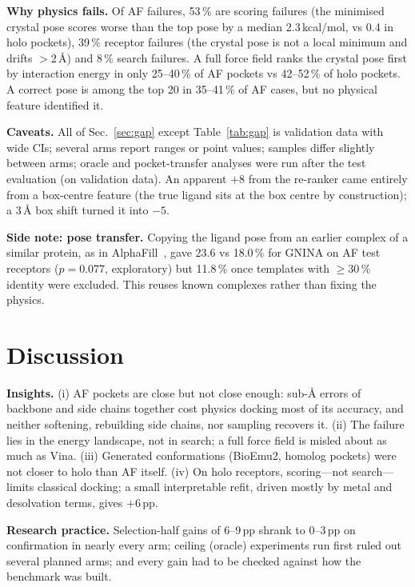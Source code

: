 \documentclass[10pt,a4paper,twocolumn]{article}
\newcommand{\pp}{\,pp}
\begin{document}
\textbf{Why physics fails.} Of AF failures, 53\,\% are scoring failures (the minimised crystal pose scores worse than
the top pose by a median 2.3\,kcal/mol, vs 0.4 in holo pockets), 39\,\% receptor failures (the crystal pose is not a
local minimum and drifts $>2$\,\AA) and 8\,\% search failures. A full force field ranks the crystal pose first by
interaction energy in only 25--40\,\% of AF pockets vs 42--52\,\% of holo pockets. A correct pose is among the top 20
in 35--41\,\% of AF cases, but no physical feature identified it.

\textbf{Caveats.} All of Sec.~\ref{sec:gap} except Table~\ref{tab:gap} is validation data with wide CIs; several arms
report ranges or point values; samples differ slightly between arms; oracle and pocket-transfer analyses were run
after the test evaluation (on validation data). An apparent $+8$ from the re-ranker came entirely from a box-centre
feature (the true ligand sits at the box centre by construction); a 3\,\AA{} box shift turned it into $-5$.

\textbf{Side note: pose transfer.} Copying the ligand pose from an earlier complex of a similar protein, as in
AlphaFill~\cite{hekkelman2023}, gave 23.6 vs 18.0\,\% for GNINA on AF test receptors ($p=0.077$, exploratory) but
11.8\,\% once templates with $\geq 30$\,\% identity were excluded. This reuses known complexes rather than fixing the
physics.

\section{Discussion}

\textbf{Insights.} (i) AF pockets are close but not close enough: sub-\AA{} errors of backbone and side chains together
cost physics docking most of its accuracy, and neither softening, rebuilding side chains, nor sampling recovers it.
(ii) The failure lies in the energy landscape, not in search; a full force field is misled about as much as Vina.
(iii) Generated conformations (BioEmu2, homolog pockets) were not closer to holo than AF itself. (iv) On holo
receptors, scoring---not search---limits classical docking; a small interpretable refit, driven mostly by metal and
desolvation terms, gives $+6$\pp.

\textbf{Research practice.} Selection-half gains of 6--9\pp{} shrank to 0--3\pp{} on confirmation in nearly every
arm; ceiling (oracle) experiments run first ruled out several planned arms; and every gain had to be checked against
how the benchmark was built.
\end{document}
